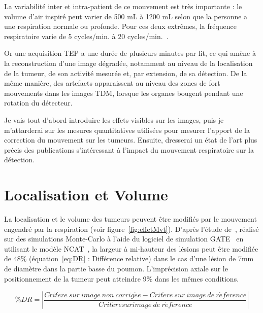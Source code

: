 La variabilité inter et intra-patient de ce mouvement est très importante : le volume d'air inspiré peut varier de 500 mL à 1200 mL selon que la personne a une respiration normale ou profonde. Pour ces deux extrêmes, la fréquence respiratoire varie de 5 cycles/min. à 20 cycles/min.~\cite{sherwood2006fundamentals}.

Or une acquisition TEP a une durée de plusieurs minutes par lit, ce qui amène à la reconstruction d'une image dégradée, notamment au niveau de la localisation de la tumeur, de son activité mesurée et, par extension, de sa détection. De la même manière, des artefacts apparaissent au niveau des zones de fort mouvements dans les images TDM, lorsque les organes bougent pendant une rotation du détecteur.

Je vais tout d'abord introduire les effets visibles sur les images, puis je m'attarderai sur les mesures quantitatives utilisées pour mesurer l'apport de la correction du mouvement sur les tumeurs. Ensuite, dresserai un état de l'art plus précis des publications s'intéressant à l'impact du mouvement respiratoire sur la détection.

\section{Localisation et Volume}


La localisation et le volume des tumeurs peuvent être modifiés par le mouvement engendré par la respiration (voir figure~\ref{fig:effetMvt}). D'après l'étude de~\cite{lamare2007respiratory}, réalisé sur des simulations Monte-Carlo à l'aide du logiciel de simulation GATE~\cite{jan2004gate} en utilisant le modèle NCAT~\cite{segars2001These}, la largeur à mi-hauteur des lésions peut être modifiée de 48\% (équation~\ref{eq:DR} : Différence relative) dans le cas d'une lésion de 7mm de diamètre dans la partie basse du poumon. L'imprécision axiale sur le positionnement de la tumeur peut atteindre 9\% dans les mêmes conditions.

\begin{equation}
\%DR= \left| \frac{Crit\grave{e}re~sur~image~non~corrig\acute{e}e - Crit\grave{e}re~sur~image~de~r\acute{e}f\acute{e}rence}{Crit\grave{e}re sur image~de~r\acute{e}f\acute{e}rence} \right|
\label{eq:PRD}
\end{equation}


